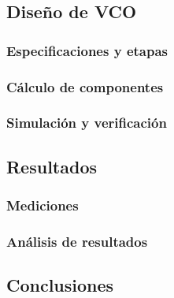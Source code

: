\subsection{Dise\~no de VCO}

\subsubsection{Especificaciones y etapas}

\subsubsection{C\'alculo de componentes}

\subsubsection{Simulaci\'on y verificaci\'on}

\subsection{Resultados}

\subsubsection{Mediciones}

\subsubsection{An\'alisis de resultados}

\subsection{Conclusiones}